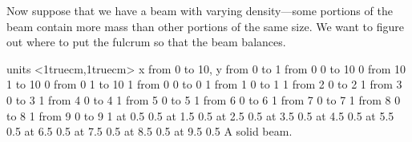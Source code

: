Now suppose that we have a beam with varying density---some portions
of the beam contain more mass than other portions of the same size. We
want to figure out where to put the fulcrum so that the beam balances.

\figure
\texonly
\vbox{\beginpicture
\normalgraphs
\ninepoint
\setcoordinatesystem units <1truecm,1truecm>
\setplotarea x from 0 to 10, y from 0 to 1
\putrule from 0 0 to 10 0
\putrule from 10 1 to 10 0
\putrule from 0 1 to 10 1
\putrule from 0 0 to 0 1
\putrule from 1 0 to 1 1
\putrule from 2 0 to 2 1
\putrule from 3 0 to 3 1
\putrule from 4 0 to 4 1
\putrule from 5 0 to 5 1
\putrule from 6 0 to 6 1
\putrule from 7 0 to 7 1
\putrule from 8 0 to 8 1
\putrule from 9 0 to 9 1
 at 0.5 0.5
 at 1.5 0.5
 at 2.5 0.5
 at 3.5 0.5
 at 4.5 0.5
 at 5.5 0.5
 at 6.5 0.5
 at 7.5 0.5
 at 8.5 0.5
 at 9.5 0.5
\endpicture}
\endtexonly
{}
\begincaption
A solid beam.
\endcaption
\endfigure

